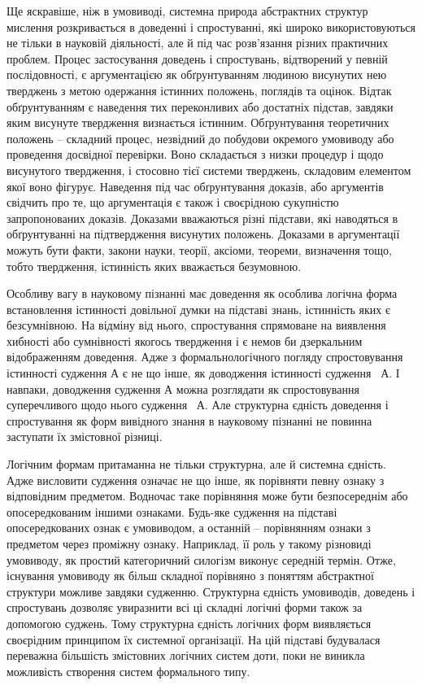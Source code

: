 Ще яскравіше, ніж в умовиводі, системна природа абстрактних структур
мислення розкривається в доведенні і спростуванні, які широко
використовуються не тільки в науковій діяльності, але й під час розв’язання
різних практичних проблем. Процес застосування доведень і спростувань,
відтворений у певній послідовності, є аргументацією як обґрунтуванням
людиною висунутих нею тверджень з метою одержання істинних положень,
поглядів та оцінок. Відтак обґрунтуванням є наведення тих переконливих або
достатніх підстав, завдяки яким висунуте твердження визнається істинним.
Обґрунтування теоретичних положень – складний процес, незвідний до
побудови окремого умовиводу або проведення досвідної перевірки. Воно
складається з низки процедур і щодо висунутого твердження, і стосовно тієї
системи тверджень, складовим елементом якої воно фігурує. Наведення під час
обґрунтування доказів, або аргументів свідчить про те, що аргументація є також
і своєрідною сукупністю запропонованих доказів. Доказами вважаються різні
підстави, які наводяться в обґрунтуванні на підтвердження висунутих
положень. Доказами в аргументації можуть бути факти, закони науки, теорії,
аксіоми, теореми, визначення тощо, тобто твердження, істинність яких
вважається безумовною.

Особливу вагу в науковому пізнанні має доведення як особлива логічна
форма встановлення істинності довільної думки на підставі знань, істинність
яких є безсумнівною. На відміну від нього, спростування спрямоване на
виявлення хибності або сумнівності якогось твердження і є немов би
дзеркальним відображенням доведення. Адже з формальнологічного погляду
спростовування істинності судження А є не що інше, як доводження істинності
судження ~А. І навпаки, доводження судження А можна розглядати як
спростовування суперечливого щодо нього судження ~А. Але структурна
єдність доведення і спростування як форм вивідного знання в науковому
пізнанні не повинна заступати їх змістовної різниці.

Логічним формам притаманна не тільки структурна, але й системна єдність.
Адже висловити судження означає не що інше, як порівняти певну ознаку з
відповідним предметом. Водночас таке порівняння може бути безпосереднім
або опосередкованим іншими ознаками. Будь-яке судження на підставі
опосередкованих ознак є умовиводом, а останній – порівнянням ознаки з
предметом через проміжну ознаку. Наприклад, її роль у такому різновиді
умовиводу, як простий категоричний силогізм виконує середній термін. Отже,
існування умовиводу як більш складної порівняно з поняттям абстрактної
структури можливе завдяки судженню. Структурна єдність умовиводів,
доведень і спростувань дозволяє увиразнити всі ці складні логічні форми також
за допомогою суджень. Тому структурна єдність логічних форм виявляється
своєрідним принципом їх системної організації. На цій підставі будувалася
переважна більшість змістовних логічних систем доти, поки не виникла
можливість створення систем формального типу.

